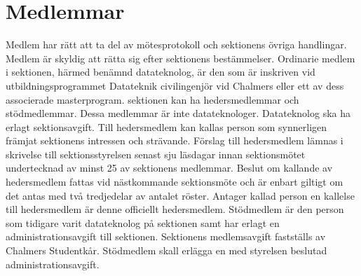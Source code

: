 \documentclass[a4paper]{dtek}
\begin{document}
\section{Medlemmar}
\para Medlem har rätt att ta del av mötesprotokoll och sektionens övriga handlingar.
\para Medlem är skyldig att rätta sig efter sektionens bestämmelser.
\para[Datateknologer] Ordinarie medlem i sektionen, härmed benämnd datateknolog, är den som är inskriven vid utbildningsprogrammet Datateknik civilingenjör vid Chalmers eller ett av dess associerade masterprogram. 
\para sektionen kan ha hedersmedlemmar och stödmedlemmar.
\stycke Dessa medlemmar är inte datateknologer.
\para Datateknolog ska ha erlagt sektionsavgift.
\para[Hedersmedlem] Till hedersmedlem kan kallas person som synnerligen främjat sektionens intressen och strävande.
\para Förslag till hedersmedlem lämnas i skrivelse till sektionsstyrelsen senast sju läsdagar innan sektionsmötet undertecknad av minst 25 av sektionens medlemmar.
\para Beslut om kallande av hedersmedlem fattas vid nästkommande sektionsmöte och är enbart giltigt om det antas med två tredjedelar av antalet röster.
\para Antager kallad person en kallelse till hedersmedlem är denne officiellt hedersmedlem.
\para[Stödmedlem] Stödmedlem är den person som tidigare varit datateknolog på sektionen samt har erlagt en administrationsavgift till sektionen.
\para[Avgifter] Sektionens medlemsavgift fastställs av Chalmers Studentkår.
\para Stödmedlem skall erlägga en med styrelsen beslutad administrationsavgift.
\end{document}
